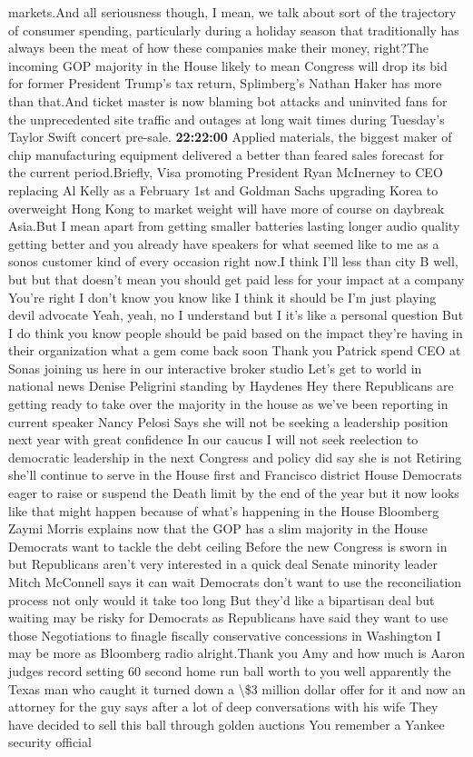 \documentclass{article}%
\begin{document}
markets.And all seriousness though, I mean, we talk about sort of the trajectory of consumer spending, particularly during a holiday season that traditionally has always been the meat of how these companies make their money, right?The incoming GOP majority in the House likely to mean Congress will drop its bid for former President Trump's tax return, Splimberg's Nathan Haker has more than that.And ticket master is now blaming bot attacks and uninvited fans for the unprecedented site traffic and outages at long wait times during Tuesday's Taylor Swift concert pre{-}sale.%
\textbf{22:22:00}%
\newline%
Applied materials, the biggest maker of chip manufacturing equipment delivered a better than feared sales forecast for the current period.Briefly, Visa promoting President Ryan McInerney to CEO replacing Al Kelly as a February 1st and Goldman Sachs upgrading Korea to overweight Hong Kong to market weight will have more of course on daybreak Asia.But I mean apart from getting smaller batteries lasting longer audio quality getting better and you already have speakers for what seemed like to me as a sonos customer kind of every occasion right now.I think I'll less than city B well, but but that doesn't mean you should get paid less for your impact at a company You're right I don't know you know like I think it should be I'm just playing devil advocate Yeah, yeah, no I understand but I it's like a personal question But I do think you know people should be paid based on the impact they're having in their organization what a gem come back soon Thank you Patrick spend CEO at Sonas joining us here in our interactive broker studio Let's get to world in national news Denise Peligrini standing by Haydenes Hey there Republicans are getting ready to take over the majority in the house as we've been reporting in current speaker Nancy Pelosi Says she will not be seeking a leadership position next year with great confidence In our caucus I will not seek reelection to democratic leadership in the next Congress and policy did say she is not Retiring she'll continue to serve in the House first and Francisco district House Democrats eager to raise or suspend the Death limit by the end of the year but it now looks like that might happen because of what's happening in the House Bloomberg Zaymi Morris explains now that the GOP has a slim majority in the House Democrats want to tackle the debt ceiling Before the new Congress is sworn in but Republicans aren't very interested in a quick deal Senate minority leader Mitch McConnell says it can wait Democrats don't want to use the reconciliation process not only would it take too long But they'd like a bipartisan deal but waiting may be risky for Democrats as Republicans have said they want to use those Negotiations to finagle fiscally conservative concessions in Washington I may be more as Bloomberg radio alright.Thank you Amy and how much is Aaron judges record setting 60 second home run ball worth to you well apparently the Texas man who caught it turned down a \textbackslash{}\$3 million dollar offer for it and now an attorney for the guy says after a lot of deep conversations with his wife They have decided to sell this ball through golden auctions You remember a Yankee security official 
\end{document}
